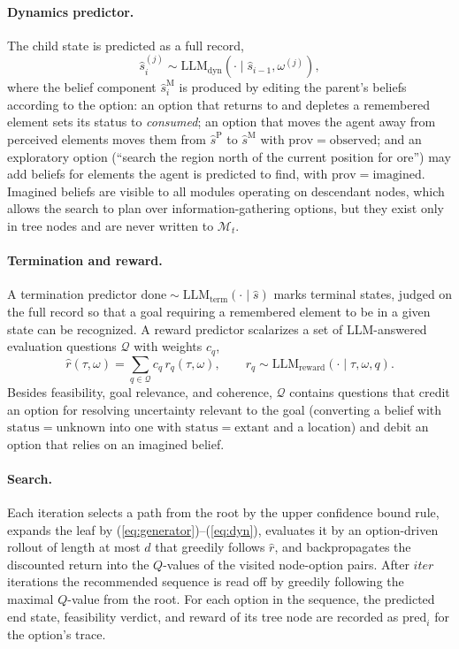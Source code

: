 \documentclass[11pt]{article}
\newcommand{\llm}[1]{\mathrm{LLM}_{\mathrm{#1}}}
\newcommand{\calM}{\mathcal{M}}
\newcommand{\calQ}{\mathcal{Q}}
\newcommand{\shat}{\hat{s}}
\newcommand{\prov}{\mathrm{prov}}
\newcommand{\stat}{\mathrm{status}}
\begin{document}
\paragraph{Dynamics predictor.}
The child state is predicted as a full record,
\begin{equation}
\shat^{(j)}_i\sim\llm{dyn}(\cdot\mid\shat_{i-1},\omega^{(j)}),
\label{eq:dyn}
\end{equation}
where the belief component $\hat s^{\mathrm{M}}_i$ is produced by editing the parent's beliefs according to the option: an option that returns to and depletes a remembered element sets its status to \emph{consumed}; an option that moves the agent away from perceived elements moves them from $\hat s^{\mathrm{P}}$ to $\hat s^{\mathrm{M}}$ with $\prov=\mathrm{observed}$; and an exploratory option (``search the region north of the current position for ore'') may add beliefs for elements the agent is predicted to find, with $\prov=\mathrm{imagined}$. Imagined beliefs are visible to all modules operating on descendant nodes, which allows the search to plan over information-gathering options, but they exist only in tree nodes and are never written to $\calM_t$.

\paragraph{Termination and reward.}
A termination predictor $\mathrm{done}\sim\llm{term}(\cdot\mid\shat)$ marks terminal states, judged on the full record so that a goal requiring a remembered element to be in a given state can be recognized. A reward predictor scalarizes a set of LLM-answered evaluation questions $\calQ$ with weights $c_q$,
\begin{equation}
\hat r(\tau,\omega)=\textstyle\sum_{q\in\calQ}c_q\,r_q(\tau,\omega),\qquad r_q\sim\llm{reward}(\cdot\mid\tau,\omega,q).
\label{eq:reward}
\end{equation}
Besides feasibility, goal relevance, and coherence, $\calQ$ contains questions that credit an option for resolving uncertainty relevant to the goal (converting a belief with $\stat=\mathrm{unknown}$ into one with $\stat=\mathrm{extant}$ and a location) and debit an option that relies on an imagined belief.

\paragraph{Search.}
Each iteration selects a path from the root by the upper confidence bound rule, expands the leaf by (\ref{eq:generator})--(\ref{eq:dyn}), evaluates it by an option-driven rollout of length at most $d$ that greedily follows $\hat r$, and backpropagates the discounted return into the $Q$-values of the visited node-option pairs. After $\mathit{iter}$ iterations the recommended sequence is read off by greedily following the maximal $Q$-value from the root. For each option in the sequence, the predicted end state, feasibility verdict, and reward of its tree node are recorded as $\mathrm{pred}_i$ for the option's trace.
\end{document}
